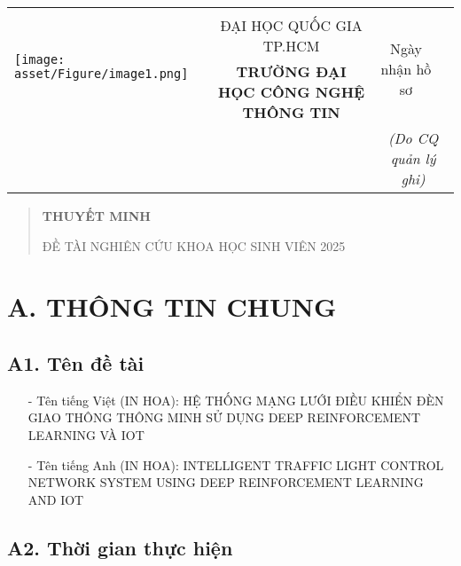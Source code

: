 \documentclass[letterpaper]{article}
\author{Khoa Nguyen}
\date{Oct 2023}
\begin{document}
\begin{table*}[!ht]
    \centering
    \begin{tabular}{m{6em} c  m{7em} m{5em} }
   

         \multirow{3}{3em}{
         \begin{minipage}{0.15\textwidth}
      \texttt{[image: asset/Figure/image1.png]}
    \end{minipage}} & 
     & & \\  \cline{3-4}
     & \small ĐẠI HỌC QUỐC GIA TP.HCM &  \multicolumn{1}{|c|}{\multirow{2}{8em}{\small Ngày nhận hồ sơ}} &  \multicolumn{1}{|c|}{}\\
    & \small \textbf{TRƯỜNG ĐẠI HỌC CÔNG NGHỆ THÔNG TIN} & \multicolumn{1}{|c|}{} &  \multicolumn{1}{|c|}{}\\\cline{3-4}

        & & \multicolumn{2}{|c|}{\textit{\small (Do CQ quản lý ghi)}}\\ \cline{3-4}
    
    \end{tabular}
\end{table*}

\begin{quote}
\centering
\textbf{\Large THUYẾT MINH}

\Large ĐỀ TÀI NGHIÊN CỨU KHOA HỌC SINH VIÊN 2025
\end{quote}


\section{A. THÔNG TIN CHUNG}

\subsection{A1. Tên đề tài}


\begin{itemize}
\item[-]  Tên tiếng Việt (IN HOA): HỆ THỐNG MẠNG LƯỚI ĐIỀU KHIỂN ĐÈN GIAO THÔNG THÔNG
MINH SỬ DỤNG DEEP REINFORCEMENT LEARNING VÀ IOT
\item[-]  Tên tiếng Anh (IN HOA): INTELLIGENT TRAFFIC LIGHT CONTROL NETWORK SYSTEM
USING DEEP REINFORCEMENT LEARNING AND IOT 
\end{itemize}


\subsection{A2. Thời gian thực hiện}
\end{document}
